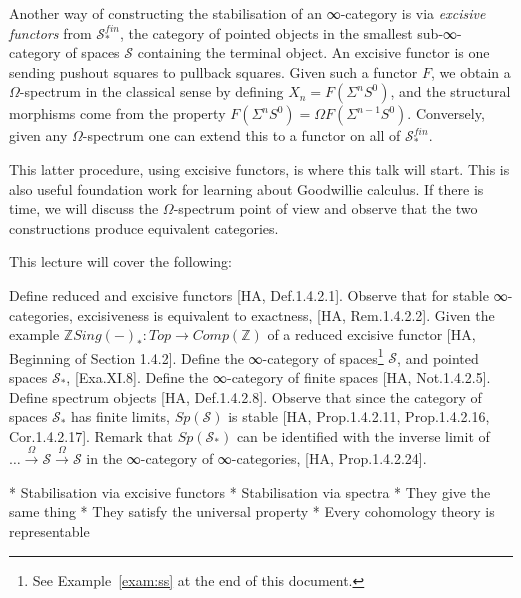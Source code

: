 \documentclass[a4paper]{amsart}
\numberwithin{figure}{section}
\theoremstyle{theorem}
\theoremstyle{definition}
\newcommand{\ZZ}{\mathbb{Z}}
\newcommand{\Spaces}{{\mathcal{S}}}
\newcommand{\Sp}{{\mathcal{S}}}
\begin{document}
Another way of constructing the stabilisation of an ∞-category is via \emph{excisive functors} from $\Spaces^{fin}_*$, the category of pointed objects in the smallest sub-∞-category of spaces $\Spaces$ containing the terminal object. An excisive functor is one sending pushout squares to pullback squares. Given such a functor $F$, we obtain a $\Omega$-spectrum in the classical sense by defining $X_n = F(\Sigma^n S^0)$, and the structural morphisms come from the property $F(\Sigma^n S^0) = \Omega F(\Sigma^{n-1} S^0)$. Conversely, given any $\Omega$-spectrum one can extend this to a functor on all of $\Spaces^{fin}_*$. 

This latter procedure, using excisive functors, is where this talk will start. This is also useful foundation work for learning about Goodwillie calculus. If there is time, we will discuss the $\Omega$-spectrum point of view and observe that the two constructions produce equivalent categories.


This lecture will cover the following:

Define reduced and excisive functors [HA, Def.1.4.2.1]. %
Observe that for stable ∞-categories, excisiveness is equivalent to exactness, [HA, Rem.1.4.2.2]. %
Given the example $\ZZ Sing(-)_*: Top → Comp(\ZZ)$ of a reduced excisive functor [HA, Beginning of Section 1.4.2]. %
Define the ∞-category of spaces\footnote{%
See Example~\ref{exam:ss} at the end of this document.
} %
$\Sp$, and pointed spaces $\Sp_*$,  [Exa.XI.8]. %
Define the ∞-category of finite spaces [HA, Not.1.4.2.5]. %
Define spectrum objects [HA, Def.1.4.2.8]. %
Observe that since the category of spaces $\Sp_*$ has finite limits, $Sp(\Sp)$ is stable [HA, Prop.1.4.2.11, Prop.1.4.2.16, Cor.1.4.2.17]. %
Remark that $Sp(\Sp_*)$ can be identified with the inverse limit of $\dots \stackrel{\Omega}{\to} \Sp \stackrel{\Omega}{\to} \Sp$ in the ∞-category of ∞-categories, [HA, Prop.1.4.2.24]. 


* Stabilisation via excisive functors
* Stabilisation via spectra
* They give the same thing
* They satisfy the universal property
* Every cohomology theory is representable
\end{document}
